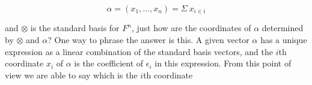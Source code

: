 \[\alpha=(x_{1},\ldots,x_{n})=\Sigma\ x_{i\in i}\]

and \(\otimes\) is the standard basis for \(F^{n}\), just how are the coordinates of \(\alpha\) determined by \(\otimes\) and \(\alpha\)? One way to phrase the answer is this. A given vector \(\alpha\) has a unique expression as a linear combination of the standard basis vectors, and the \(i\)th coordinate \(x_{i}\) of \(\alpha\) is the coefficient of \(\epsilon_{i}\) in this expression. From this point of view we are able to say which is the \(i\)th coordinate 